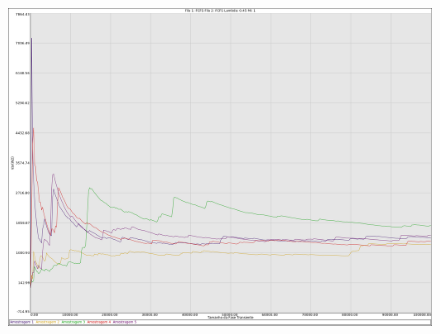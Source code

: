 \documentclass[a4paper,10pt]{article}
\begin{document}
\begin{figure}
\includegraphics[scale = 0.2]{./graficos_transiente_1/FCFS/10.png}
\end{figure}




\end{document}
